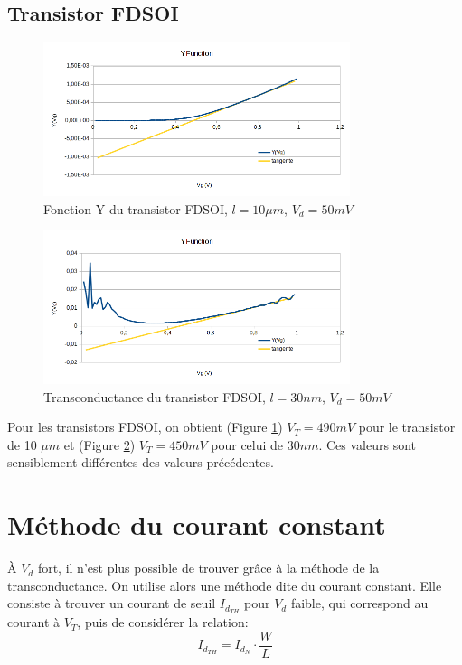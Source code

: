 \documentclass[a4paper,11pt]{report}
\begin{document}
\subsection{Transistor FDSOI}
\begin{figure}[h]
    \begin{center}
        \includegraphics[width=0.8\textwidth]{Images/FD1-10-YFunction}
        \caption{Fonction Y du transistor FDSOI, $l=10\mu m$, $V_d = 50mV$}
        \label{yfun_fdsoi_10um}
    \end{center}
\end{figure}
\begin{figure}[h]
    \begin{center}
        \includegraphics[width=0.8\textwidth]{Images/FD11-30-YFunction}
        \caption{Transconductance du transistor FDSOI, $l=30nm$, $V_d = 50mV$}
        \label{yfun_fdsoi_30nm}
    \end{center}
\end{figure}

Pour les transistors FDSOI, on obtient (Figure \ref{yfun_fdsoi_10um}) $V_T=490mV$ pour le transistor de 10 $\mu m$ et (Figure \ref{yfun_fdsoi_30nm}) $V_T=450mV$ pour celui de $30nm$. Ces valeurs sont sensiblement différentes des valeurs précédentes.


\section{Méthode du courant constant}
À $V_d$ fort, il n'est plus possible de trouver grâce à la méthode de la transconductance. On utilise alors une méthode dite du courant constant. Elle consiste à trouver un courant de seuil $I_{d_{TH}}$ pour $V_d$ faible, qui correspond au courant à $V_T$, puis de considérer la relation: \[I_{d_{TH}}=I_{d_{N}}\cdot\dfrac{W}{L}\]
\end{document}
